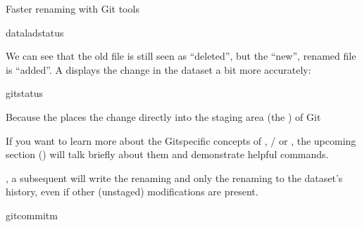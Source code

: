 \begin{findoutmore}[label={fom-gitmv}, before title={\thetcbcounter\ }, float, floatplacement=tb, check odd page=true]{Faster renaming with Git tools}
\begin{sphinxVerbatim}[commandchars=\\\{\}]
dataladstatus
\end{sphinxVerbatim}

\sphinxAtStartPar
We can see that the old file is still seen as “deleted”, but the “new”,
renamed file is “added”. A  displays the change
in the dataset a bit more accurately:

\begin{sphinxVerbatim}[commandchars=\\\{\}]
gitstatus
\end{sphinxVerbatim}

\sphinxAtStartPar
Because the  places the change directly into the
staging area (the ) of Git%
\begin{footnote}\sphinxAtStartFootnote
If you want to learn more about the Git\sphinxhyphen{}specific concepts of ,
/ or , the upcoming section {\hyperref[\detokenize{basics/101-137-history:history}]{}} () will
talk briefly about them and demonstrate helpful commands.
%
\end{footnote},
a subsequent  will write the renaming
\textendash{} and only the renaming \textendash{} to the dataset’s history, even if other
(unstaged) modifications are present.

\begin{sphinxVerbatim}[commandchars=\\\{\}]
gitcommit\PYGZhy{}m
\end{sphinxVerbatim}


\end{findoutmore}

